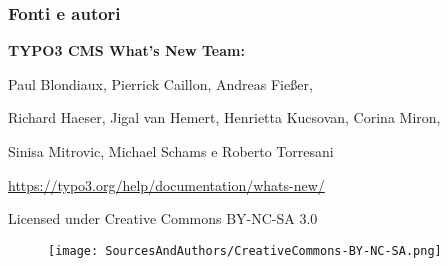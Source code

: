 
\begin{frame}[fragile]
	\frametitle{Fonti e autori}

	\vspace{-0.6cm}

	\centerline{\textbf{TYPO3 CMS What's New Team:}}

	\begin{center}
		\centerline{Paul Blondiaux, Pierrick Caillon, Andreas Fießer,}
		\centerline{Richard Haeser, Jigal van Hemert, Henrietta Kucsovan, Corina Miron,}
		\centerline{Sinisa Mitrovic, Michael Schams e Roberto Torresani}
	\end{center}

	\vspace{0.6cm}

	\smaller\begin{center}\url{https://typo3.org/help/documentation/whats-new/}\end{center}\normalsize

	\vspace{1cm}

	\smaller\begin{center}Licensed under Creative Commons BY-NC-SA 3.0\end{center}\normalsize
	\begin{figure}\vspace*{-0.4cm}
		\texttt{[image: SourcesAndAuthors/CreativeCommons-BY-NC-SA.png]}
	\end{figure}

\end{frame}

